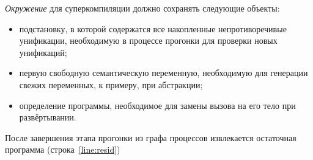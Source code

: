 
\emph{Окружение} для суперкомпиляции должно сохранять следующие объекты:
\begin{itemize}
\item подстановку, в которой содержатся все накопленные непротиворечивые унификации,
      необходимую в процессе прогонки для проверки новых унификаций;
\item первую свободную семантическую переменную, необходимую для генерации свежих переменных,
      к примеру, при абстракции;
\item определение программы, необходимое для замены вызова на его тело при развёртывании.
\end{itemize}


После завершения этапа прогонки из графа процессов извлекается остаточная программа
(строка~\ref{line:resid})



